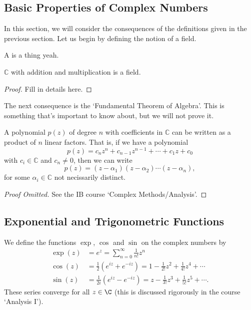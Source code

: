 \documentclass[a4]{scrartcl}
\begin{document}
\subsection{Basic Properties of Complex Numbers}

In this section, we will consider the consequences of the definitions given in the previous section.
Let us begin by defining the notion of a field.

\begin{definition}
	A  is a thing yeah.
\end{definition}

\begin{proposition}
	$\mathbb{C}$ with addition and multiplication is a field.
\end{proposition}
\begin{proof}
	Fill in details here.
\end{proof}

The next consequence is the `Fundamental Theorem of Algebra'.
This is something that's important to know about, but we will not prove it.

\begin{theorem}
	A polynomial $p(z)$ of degree $n$ with coefficients in $\mathbb{C}$ can be written as a product of $n$ linear factors. That is, if we have a polynomial
	$$
	p(z) = c_n z^n + c_{n - 1} z^{n - 1} + \cdots + c_1 z + c_0
	$$
	with $c_i \in \mathbb{C}$ and $c_n \neq 0$, then we can write
	$$
	p(z) = (z - \alpha_1) (z - \alpha_2) \cdots (z - \alpha_n),
	$$ 
	for some $\alpha_i \in \mathbb{C}$ not necissarily distinct.
\end{theorem}
\begin{proof}[Proof Omitted]
	See the IB course `Complex Methods/Analysis'.
\end{proof}

\subsection{Exponential and Trigonometric Functions}

We define the functions $\exp$, $\cos$ and $\sin$ on the complex numbers by
\begin{align*}
	\exp(z) &= e^z = \sum_{n = 0}^\infty \frac{1}{n!} z^n \\
	\cos (z) &= \frac{1}{2}(e^{iz} + e^{-iz}) = 1 - \frac{1}{2!} z^2 + \frac{1}{4!} z^4 + \cdots \\
	\sin (z) &= \frac{1}{2i}(e^{iz} - e^{-iz}) = z - \frac{1}{3!}z^3 + \frac{1}{5!} z^5 + \cdots.
\end{align*}
These series converge for all $z \in \C$ (this is discussed rigorously in the course `Analysis I').
\end{document}
